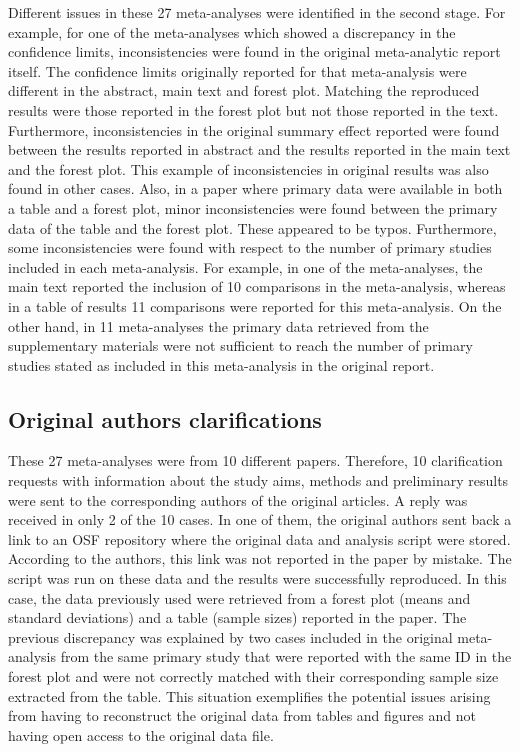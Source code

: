 \documentclass[
  ,apa7,floatsintext]{apa6}
\begin{document}
Different issues in these 27 meta-analyses were identified in the second stage. For example, for one of the meta-analyses which showed a discrepancy in the confidence limits, inconsistencies were found in the original meta-analytic report itself. The confidence limits originally reported for that meta-analysis were different in the abstract, main text and forest plot. Matching the reproduced results were those reported in the forest plot but not those reported in the text. Furthermore, inconsistencies in the original summary effect reported were found between the results reported in abstract and the results reported in the main text and the forest plot. This example of inconsistencies in original results was also found in other cases. Also, in a paper where primary data were available in both a table and a forest plot, minor inconsistencies were found between the primary data of the table and the forest plot. These appeared to be typos.
Furthermore, some inconsistencies were found with respect to the number of primary studies included in each meta-analysis. For example, in one of the meta-analyses, the main text reported the inclusion of 10 comparisons in the meta-analysis, whereas in a table of results 11 comparisons were reported for this meta-analysis. On the other hand, in 11 meta-analyses the primary data retrieved from the supplementary materials were not sufficient to reach the number of primary studies stated as included in this meta-analysis in the original report.

\hypertarget{original-authors-clarifications}{%
\subsection{Original authors clarifications}\label{original-authors-clarifications}}

These 27 meta-analyses were from 10 different papers. Therefore, 10 clarification requests with information about the study aims, methods and preliminary results were sent to the corresponding authors of the original articles. A reply was received in only 2 of the 10 cases.
In one of them, the original authors sent back a link to an OSF repository where the original data and analysis script were stored. According to the authors, this link was not reported in the paper by mistake. The script was run on these data and the results were successfully reproduced. In this case, the data previously used were retrieved from a forest plot (means and standard deviations) and a table (sample sizes) reported in the paper. The previous discrepancy was explained by two cases included in the original meta-analysis from the same primary study that were reported with the same ID in the forest plot and were not correctly matched with their corresponding sample size extracted from the table. This situation exemplifies the potential issues arising from having to reconstruct the original data from tables and figures and not having open access to the original data file.
\end{document}
